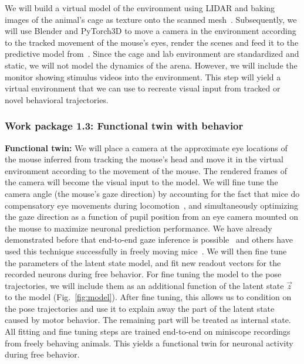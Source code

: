 \documentclass[B2,COG]{ercgrant}
\begin{document}
We will build a virtual model of the environment using LIDAR and baking images of the animal's cage as texture onto the scanned mesh~\parencite[similar as in][]{Holmgren2021-jv}.
Subsequently, we will use Blender and PyTorch3D to move a camera in the environment according to the tracked movement of the mouse's eyes, render the scenes and feed it to the predictive model from~.
Since the cage and lab environment are standardized and static, we will not model the dynamics of the arena. 
However, we will include the monitor showing stimulus videos into the environment. 
This step will yield a virtual environment that we can use to recreate visual input from tracked or novel behavioral trajectories.


\subsubsection{Work package 1.3: Functional twin with behavior\hfill{}}

\textbf{Functional twin:} We will place a camera at the approximate eye locations of the mouse inferred from tracking the mouse's head and move it in the virtual environment according to the movement of the mouse. 
The rendered frames of the camera will become the visual input to the model.
We will fine tune the camera angle (the mouse's gaze direction) by accounting for the fact that mice do compensatory eye movements during locomotion~\parencite[similar to rats][]{Wallace2013-lf}, and simultaneously optimizing the gaze direction as a function of pupil position from an eye camera 
mounted on the mouse to maximize neuronal prediction performance. 
We have already demonstrated before that end-to-end gaze inference is possible~\parencite{Sinz2018-sk,Walker2019-yw} and others have used this technique successfully in freely moving mice~\parencite{Parker2022-ac}.
We will then fine tune the parameters of the latent state model, and fit new readout vectors for the recorded neurons during free behavior.
For fine tuning the model to the pose trajectories, we will include them as an additional function of the latent state $\vec{z}$ to the model (Fig.~\ref{fig:model}). 
After fine tuning, this allows us to condition on the pose trajectories and use it to explain away the part of the latent state caused by motor behavior.
The remaining part will be treated as internal state. 
All fitting and fine tuning steps are trained end-to-end  on  miniscope recordings from freely behaving animals. 
This yields a functional twin for neuronal activity during free behavior.
\end{document}

